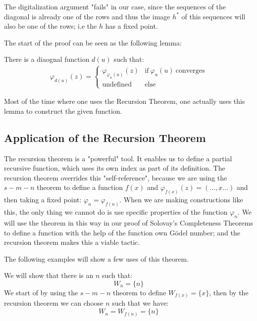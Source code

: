 \documentclass[../main.tex]{subfiles}
\begin{document}
The digitalization argument "fails" in our case, since the sequences of the
diagonal is already one of the rows and thus the image $h^*$ of this
sequences will also be one of the rows; i.e the $h$ has a fixed point.

The start of the proof can be seen as the following lemma:
\begin{lem}
	There is a diaognal function $d(u)$ such that:
	\begin{align}\varphi_{d(u)}(z)=\begin{cases}
		\varphi_{\varphi_u(u)}(z)& \text{if}\ \varphi_u(u)\
		\text{converges}\\
		\text{undefined} & \text{else}
	\end{cases}
	\end{align}
\end{lem}

Most of the time where one uses the Recursion Theorem, one actually uses this
lemma to construct the given function.

\subsection{Application of the Recursion Theorem}
The recursion theorem is a "powerful" tool. It enables us to define a partial
recursive function, which uses its own index as part of its definition. 
The recursion theorem overrides this "self-reference", because we are using the
$s-m-n$ theorem to define a function $f(x)$ and
$\varphi_{f(x)}(z)=(\ldots,x\ldots)$ and then taking a fixed point:
$\varphi_n=\varphi_{f(n)}$.  When we are making constructions like this, the
only thing we cannot do is use specific properties of the function $\varphi_n$.
We will use the theorem in this way in our proof of Solovay's Completeness
Theorems to define a function with the help of the function own Gödel number; and
the recursion theorem makes this a viable tactic.

The
following examples will show a few uses of this theorem.
\begin{exmp}
	We will show that there is an $n$ such that:
	$$W_n=\{n\}$$
	We start of by using the $s-m-n$ theorem to define $W_{f(x)}=\{x\}$,
	then by the recursion theorem we can choose $n$ such that we have:
	$$W_n=W_{f(n)}=\{n\}$$
\end{exmp}
\end{document}
